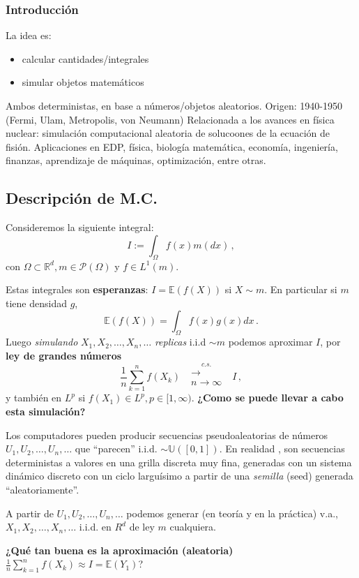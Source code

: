\documentclass[letterpaper,11pt]{article} %
\theoremstyle{defbreak}
\theoremstyle{propbreak}
\theoremstyle{remark}
\theoremstyle{break}
\def\Rd{\mathbb{R}^d}
\def\E{\mathbb{E}}
\def\vas{X_1,X_2,\dots,X_n,\dots}
\def\convcs{\mbox{ }\overset{c.s.}{\substack{\longrightarrow \\n \to \infty}}\mbox{ }}
\begin{document}
\subsubsection{Introducción}
La idea es:
\begin{itemize}
    \item calcular cantidades/integrales
    \item simular objetos matemáticos
\end{itemize}
Ambos deterministas, en base a números/objetos aleatorios.
\newp Origen: 1940-1950 (Fermi, Ulam, Metropolis, von Neumann) Relacionada a los avances en física nuclear: simulación computacional aleatoria de solucoones de la ecuación de fisión. \newline Aplicaciones en EDP, física, biología matemática, economía, ingeniería, finanzas, aprendizaje de máquinas, optimización, entre otras.

\subsection{Descripción de M.C.}
\newp Consideremos la siguiente integral:
$$ I:=\displaystyle\int_\Omega f(x)m(dx) \, ,$$
con $\Omega\subset\Rd,m\in\mathcal{P}(\Omega)$ y $f\in L^1(m)$.

Estas integrales son \textbf{esperanzas}: $I=\E(f(X))$ si $X\sim m$.
En particular si $m$ tiene densidad $g$,
$$ \E(f(X)) = \displaystyle \int_\Omega f(x)g(x)dx \, .$$
Luego \textit{simulando} $\vas$ \textit{replicas} i.i.d $\sim m$ podemos aproximar $I$, por \textbf{ley de grandes números}
$$ \displaystyle\frac{1}{n}\sum^n_{k=1}f(X_k)\convcs I \, ,$$
y también en $L^p$ si $f(X_1)\in L^p, p\in[1,\infty)$.
\newp \textbf{¿Como se puede llevar a cabo esta simulación?}

Los computadores pueden producir secuencias pseudoaleatorias de números $U_1,U_2,\dots,U_n,\dots$ que ``parecen'' i.i.d. $\sim \mathbb{U}([0,1])$. En realidad , son secuencias deterministas a valores en una grilla discreta muy fina, generadas con un sistema dinámico discreto con un ciclo larguísimo a partir de una \textit{semilla} (seed) generada ``aleatoriamente''.

A partir de $U_1,U_2,\dots,U_n,\dots$ podemos generar (en teoría y en la práctica) v.a., $\vas$ i.i.d. en $R^d$ de ley $m$ cualquiera.

%
%
\newp \textbf{¿Qué tan buena es la aproximación (aleatoria)} $\displaystyle\frac{1}{n}\sum^n_{k=1}f(X_k)\approx I=\E(Y_1)$?
\end{document}
